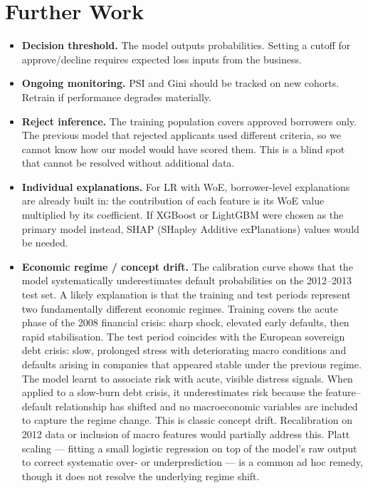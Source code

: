\documentclass[a4paper,11pt]{article}
\begin{document}
\section{Further Work}

\begin{itemize}[leftmargin=1.5em]

  \item \textbf{Decision threshold.} The model outputs probabilities. Setting a
        cutoff for approve/decline requires expected loss inputs from the business.

  \item \textbf{Ongoing monitoring.} PSI and Gini should be tracked on new cohorts.
        Retrain if performance degrades materially.

  \item \textbf{Reject inference.} The training population covers approved borrowers
        only. The previous model that rejected applicants used different criteria,
        so we cannot know how our model would have scored them. This is a blind spot
        that cannot be resolved without additional data.

  \item \textbf{Individual explanations.} For LR with WoE, borrower-level explanations
        are already built in: the contribution of each feature is its WoE value
        multiplied by its coefficient. If XGBoost or LightGBM were chosen as the
        primary model instead, SHAP (SHapley Additive exPlanations) values would be needed.

  \item \textbf{Economic regime / concept drift.} The calibration curve shows that
        the model systematically underestimates default probabilities on the 2012--2013
        test set. A likely explanation is that the training and test periods represent
        two fundamentally different economic regimes. Training covers the acute phase
        of the 2008 financial crisis: sharp shock, elevated early defaults, then rapid
        stabilisation. The test period coincides with the European sovereign debt
        crisis: slow, prolonged stress with deteriorating macro conditions and defaults
        arising in companies that appeared stable under the previous regime. The model
        learnt to associate risk with acute, visible distress signals. When applied to
        a slow-burn debt crisis, it underestimates risk because the feature--default
        relationship has shifted and no macroeconomic variables are included to capture
        the regime change. This is classic concept drift. Recalibration on 2012 data
        or inclusion of macro features would partially address this. Platt scaling ---
        fitting a small logistic regression on top of the model's raw output to correct
        systematic over- or underprediction --- is a common ad hoc remedy, though it
        does not resolve the underlying regime shift.


\end{itemize}
\end{document}
